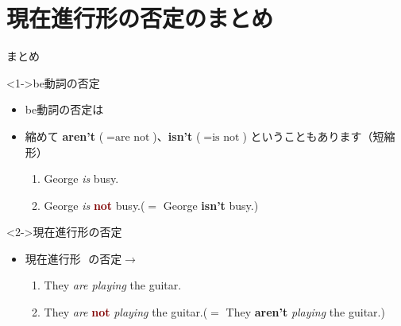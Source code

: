 \documentclass[aspectratio=169,xcolor={dvipsnames,table}]{beamer}
\begin{document}
\section{現在進行形の否定のまとめ}
\begin{frame}[plain,t]{まとめ}
 
\begin{block}<1->{be動詞の否定}\small
\begin{itemize}[square]
 \item  be動詞の否定は\,\,
 \item  縮めて {\bfseries aren't}\,\,($=\text{are not}$)、{\bfseries isn't}\,\,($=\text{is not}$) ということもあります（短縮形）
\begin{enumerate}[circle]
 \item George {\itshape is} busy.
 \item George {\itshape is} \textcolor{Maroon}{\bfseries not} busy.($=$ George {\bfseries isn't} busy.)
\end{enumerate}
\end{itemize}
\end{block}

\begin{block}<2->{現在進行形の否定}\small
\begin{itemize}[square]
 \item  現在進行形\,\,\,\,の否定$\longrightarrow$\,\,%

\begin{enumerate}[circle]
 \item They {\itshape are playing} the guitar.
 \item They {\itshape are} \textcolor{Maroon}{\bfseries not} {\itshape playing} the guitar.($=$ They {\bfseries aren't} {\itshape playing} the guitar.)
\end{enumerate}
\end{itemize}
\end{block}

\hfill{}
\end{frame}
\end{document}
